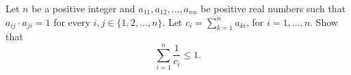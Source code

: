 Let $n$ be a positive integer and $a_{11}, a_{12}, \dots, a_{nn}$ be positive real numbers such that $a_{ij} \cdot a_{ji} = 1$ for every $i, j \in \{1, 2, \dots, n\}$. Let $c_i = \sum_{k=1}^n a_{ki}$, for $i = 1, \dots, n$. Show that \[\sum_{i=1}^n \frac{1}{c_i} \le 1.\]
